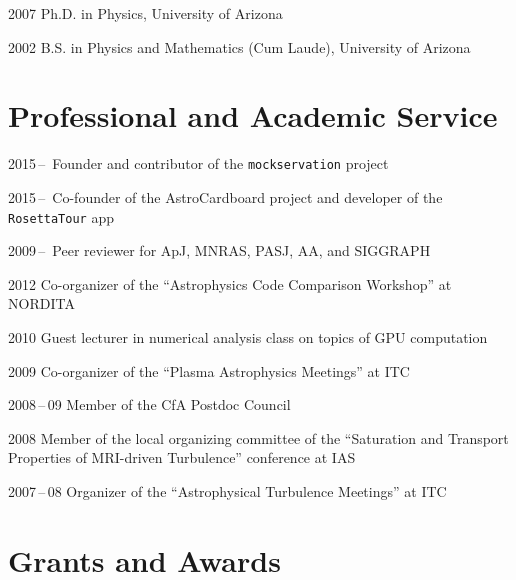 \begin{tlist}

\item[2007] Ph.D. in Physics, University of Arizona

\item[2002] B.S. in Physics and Mathematics (Cum Laude), University of Arizona

\end{tlist}

\section*{Professional and Academic Service}

\begin{tlist}

\item[2015\,--\,] Founder and contributor of the
  \texttt{mockservation} project

\item[2015\,--\,] Co-founder of the AstroCardboard project and
  developer of the \texttt{RosettaTour} app

\item[2009\,--\,] Peer reviewer for ApJ, MNRAS, PASJ, AA, and SIGGRAPH

\item[2012] Co-organizer of the ``Astrophysics Code Comparison
  Workshop'' at NORDITA

\item[2010] Guest lecturer in numerical analysis class on topics of
  GPU computation

\item[2009] Co-organizer of the ``Plasma Astrophysics Meetings'' at ITC

\item[2008\,--\,09] Member of the CfA Postdoc Council

\item[2008] Member of the local organizing committee of the
  ``Saturation and Transport Properties of MRI-driven Turbulence''
  conference at IAS

\item[2007\,--\,08] Organizer of the ``Astrophysical Turbulence
  Meetings'' at ITC

\end{tlist}

\section*{Grants and Awards}

